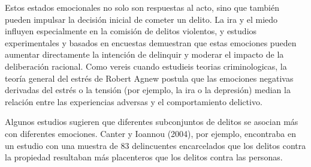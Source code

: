 \documentclass[
  spanish,
  letterpaper,
  DIV=11,
  numbers=noendperiod]{scrreprt}
\begin{document}
Estos estados emocionales no solo son respuestas al acto, sino que
también pueden impulsar la decisión inicial de cometer un delito. La ira
y el miedo influyen especialmente en la comisión de delitos violentos, y
estudios experimentales y basados en encuestas demuestran que estas
emociones pueden aumentar directamente la intención de delinquir y
moderar el impacto de la deliberación racional. Como vereis cuando
estudieis teorias criminologicas, la teoría general del estrés de Robert
Agnew postula que las emociones negativas derivadas del estrés o la
tensión (por ejemplo, la ira o la depresión) median la relación entre
las experiencias adversas y el comportamiento delictivo.

Algunos estudios sugieren que diferentes subconjuntos de delitos se
asocian más con diferentes emociones. Canter y Ioannou (2004), por
ejemplo, encontraba en un estudio con una muestra de 83 delincuentes
encarcelados que los delitos contra la propiedad resultaban más
placenteros que los delitos contra las personas.
\end{document}
